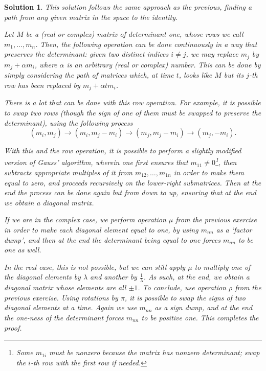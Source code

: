 \documentclass{article}
\theoremstyle{nonumberplain}
\newtheorem{sol}{Solution}
\begin{document}
\begin{sol}
This solution follows the same approach as the previous, finding a path from any given matrix in the space to the identity.

Let $M$ be a (real or complex) matrix of determinant one, whose rows we call $m_1, \dots, m_n$. Then, the following operation can be done continuously in a way that preserves the determinant: given two distinct indices $i \neq j$, we may replace $m_j$ by $m_j + \alpha m_i$, where $\alpha$ is an arbitrary (real or complex) number. This can be done by simply considering the path of matrices which, at time $t$, looks like $M$ but its $j$-th row has been replaced by $m_j + \alpha t m_i$.

There is a lot that can be done with this row operation. For example, it is possible to swap two rows (though the sign of one of them must be swapped to preserve the determinant), using the following process
\begin{equation}
(m_i, m_j) \to (m_i, m_j - m_i) \to (m_j, m_j - m_i) \to (m_j, -m_i).
\end{equation}

With this and the row operation, it is possible to perform a slightly modified version of Gauss' algorithm, wherein one first ensures that $m_{11} \neq 0$\footnote{Some $m_{1i}$ must be nonzero because the matrix has nonzero determinant; swap the $i$-th row with the first row if needed.}, then subtracts appropriate multiples of it from $m_{12}, \dots, m_{1n}$ in order to make them equal to zero, and proceeds recursively on the lower-right submatrices. Then at the end the process can be done again but from down to up, ensuring that at the end we obtain a diagonal matrix.

If we are in the complex case, we perform operation $\mu$ from the previous exercise in order to make each diagonal element equal to one, by using $m_{nn}$ as a `factor dump', and then at the end the determinant being equal to one forces $m_{nn}$ to be one as well.

In the real case, this is not possible, but we can still apply $\mu$ to multiply one of the diagonal elements by $\lambda$ and another by $\frac1\lambda$. As such, at the end, we obtain a diagonal matrix whose elements are all $\pm 1$. To conclude, use operation $\rho$ from the previous exercise. Using rotations by $\pi$, it is possible to swap the signs of two diagonal elements at a time. Again we use $m_{nn}$ as a sign dump, and at the end the one-ness of the determinant forces $m_{nn}$ to be positive one. This completes the proof.
\end{sol}
\end{document}
